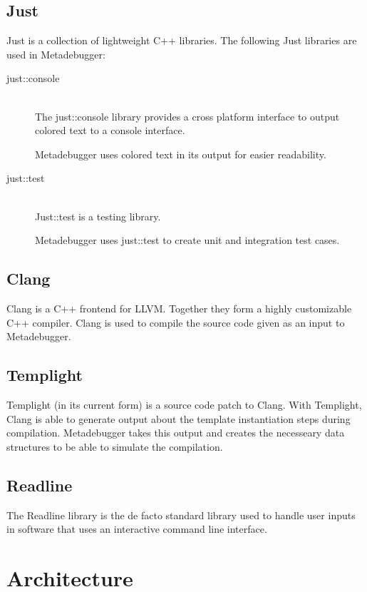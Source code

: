 \subsection*{Just\cite{just}}

Just is a collection of lightweight C++ libraries. The following Just libraries
are used in Metadebugger:
\begin{description}
    \item[just::console] \hfill \\
        The just::console library provides a cross platform interface to output
        colored text to a console interface.

        Metadebugger uses colored text in its output for easier readability.
    \item[just::test] \hfill \\
        Just::test is a testing library.

        Metadebugger uses just::test to create unit and integration test cases.
\end{description}

\subsection*{Clang\cite{clang}}

Clang is a C++ frontend for LLVM. Together they form a highly customizable C++
compiler. Clang is used to compile the source code given as an input to
Metadebugger.

\subsection*{Templight\cite{templight}}

Templight (in its current form) is a source code patch to Clang. With
Templight, Clang is able to generate output about the template instantiation
steps during compilation. Metadebugger takes this output and creates the
necesseary data structures to be able to simulate the compilation.

\subsection*{Readline\cite{readline}}

The Readline library is the de facto standard library used to handle user
inputs in software that uses an interactive command line interface.

\section{Architecture}

